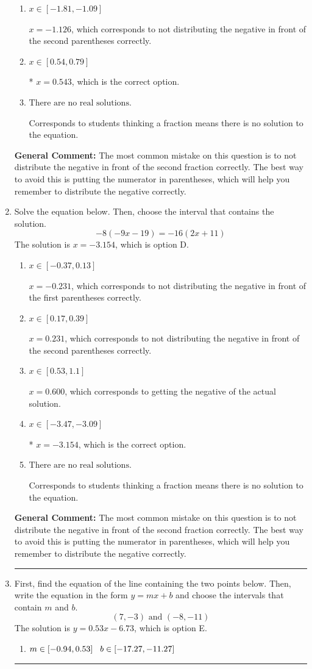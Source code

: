 \documentclass{extbook}[14pt]
\newcommand{\litem}[1]{\item #1

\rule{\textwidth}{0.4pt}}
\begin{document}
\begin{enumerate}
{\begin{enumerate}[label=\Alph*.]
$x = -0.950$, which corresponds to getting the negative of the actual solution.
\item \( x \in [-1.81, -1.09] \)

$x = -1.126$, which corresponds to not distributing the negative in front of the second parentheses correctly.
\item \( x \in [0.54, 0.79] \)

* $x = 0.543$, which is the correct option.
\item \( \text{There are no real solutions.} \)

Corresponds to students thinking a fraction means there is no solution to the equation.
\end{enumerate}

\textbf{General Comment:} The most common mistake on this question is to not distribute the negative in front of the second fraction correctly. The best way to avoid this is putting the numerator in parentheses, which will help you remember to distribute the negative correctly.
}
\litem{
Solve the equation below. Then, choose the interval that contains the solution.
\[ -8(-9x -19) = -16(2x + 11) \]The solution is \( x = -3.154 \), which is option D.\begin{enumerate}[label=\Alph*.]
\item \( x \in [-0.37, 0.13] \)

$x = -0.231$, which corresponds to not distributing the negative in front of the first parentheses correctly.
\item \( x \in [0.17, 0.39] \)

$x = 0.231$, which corresponds to not distributing the negative in front of the second parentheses correctly.
\item \( x \in [0.53, 1.1] \)

$x = 0.600$, which corresponds to getting the negative of the actual solution.
\item \( x \in [-3.47, -3.09] \)

* $x = -3.154$, which is the correct option.
\item \( \text{There are no real solutions.} \)

Corresponds to students thinking a fraction means there is no solution to the equation.
\end{enumerate}

\textbf{General Comment:} The most common mistake on this question is to not distribute the negative in front of the second fraction correctly. The best way to avoid this is putting the numerator in parentheses, which will help you remember to distribute the negative correctly.
}
\litem{
First, find the equation of the line containing the two points below. Then, write the equation in the form $ y=mx+b $ and choose the intervals that contain $m$ and $b$.
\[ (7, -3) \text{ and } (-8, -11) \]The solution is \( y = 0.53x -6.73 \), which is option E.\begin{enumerate}[label=\Alph*.]
\item \( m \in [-0.94, 0.53] \hspace*{3mm} b \in [-17.27, -11.27] \)


\end{enumerate}}
\end{enumerate}
\end{document}
